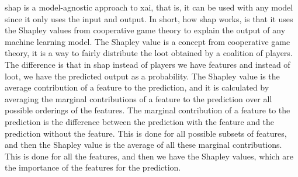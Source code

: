 
\ac{shap} \cite{lundberg_unified_2017} is a model-agnostic approach to \ac{xai}, that is, it can be used with any model since it only uses the input and output. In short, how \ac{shap} works, is that it uses the Shapley values from cooperative game theory to explain the output of any machine learning model. The Shapley value is a concept from cooperative game theory, it is a way to fairly distribute the loot obtained by a coalition of players. The difference is that in \ac{shap} instead of players we have features and instead of loot, we have the predicted output as a probability. The Shapley value is the average contribution of a feature to the prediction, and it is calculated by averaging the marginal contributions of a feature to the prediction over all possible orderings of the features. The marginal contribution of a feature to the prediction is the difference between the prediction with the feature and the prediction without the feature. This is done for all possible subsets of features, and then the Shapley value is the average of all these marginal contributions. This is done for all the features, and then we have the Shapley values, which are the importance of the features for the prediction.